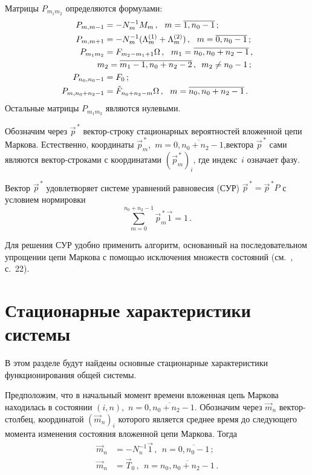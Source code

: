 \begin{multicols}{2}
Матрицы $P_{m_1m_2}$ определяются формулами:
\begin{align*}
P_{m,m-1} &= - N_m^{-1} M_m\,,
\ \ m=\overline{1,n_0-1}\,;
\\
P_{m,m+1} &= - N_m^{-1}
(\Lambda^{(1)}_m+\Lambda^{(2)}_m)\,,
\ \ m=\overline{0,n_0-1}\,;
\\
P_{m_1m_2} &=
F_{m_2-m_1+1} \Omega\,,
\ \ m_1=\overline{n_0,n_0+n_2-1}\,,\notag\\
& \hspace*{-3mm}m_2=\overline{m_1-1,n_0+n_2-2}\,,
\enskip m_2\ne n_0-1\,;
\\
P_{n_0,n_0-1} &= F_0\,;
\\
P_{m,n_0+n_2-1} &=
\tilde F_{n_0+n_2-m} \Omega\,,
\ \ m=\overline{n_0,n_0+n_2-1}\,.
\end{align*}
Остальные матрицы $P_{m_1m_2}$ являются нулевыми.

Обозначим через $\vec p^{\,*}$ век\-тор-стро\-ку стационарных
вероятностей вложенной цепи Маркова. Ес\-тественно, координаты
$\vec p^{\,*}_m$,\ $m=\overline{0,n_0+n_2-1}$,\linebreak вектора
$\vec p^{\,*}$ сами являются вектор-строками с координатами
$(\vec p^{\,*}_m)_i$, где индекс~$i$ означает фазу.

Вектор $\vec p^{\,*}$ удовлетворяет системе уравнений равновесия
(СУР) $\vec p^{\,*} = \vec p^{\,*} P$
с условием нормировки
$$
\sum\limits_{m=0}^{n_0+n_2-1} \vec p^{\,*}_m \vec1 = 1\,.
$$

Для решения СУР удобно применить алгоритм, основанный на
последовательном упрощении цепи Маркова с помощью исключения
множеств состояний (см.~\cite{15-p}, с.~22).

\section{Стационарные характеристики системы}

В этом разделе будут найдены основные стационарные характеристики
функционирования общей системы.

Предположим, что в начальный момент времени вложенная цепь
Маркова находилась в состоянии
$(i,n)$,\  $n=\overline{0,n_0+n_2-1}$.
Обозначим через $\vec m_n$ век\-тор-стол\-бец, координатой $(\vec m_n)_i$
которого является среднее время до следующего момента
изменения состояния вложенной цепи Маркова.
Тогда
\begin{align*}
\vec m_n &= - N_n^{-1} \vec1\,,
\ \ n=\overline{0,n_0-1}\,;
\\
\vec m_n &= \vec T_0\,,
\ \ n=\overline{n_0,n_0+n_2-1}\,.
\end{align*}


\end{multicols}
